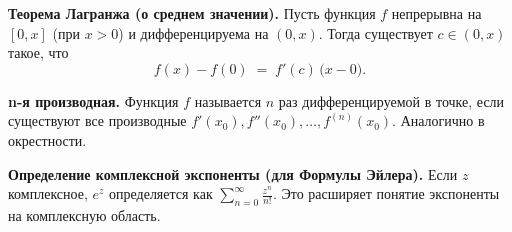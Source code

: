 
\textbf{Теорема Лагранжа (о среднем значении).}
Пусть функция $f$ непрерывна на $[0,x]$ (при $x>0$) и дифференцируема на $(0,x)$. Тогда существует $c\in(0,x)$ такое, что
\[
f(x)-f(0) \;=\; f'(c)\,\bigl(x - 0\bigr).
\]

\medskip

\textbf{n-я производная.}
Функция $f$ называется $n$ раз дифференцируемой в точке, если существуют все производные $f'(x_0), f''(x_0),\dots,f^{(n)}(x_0)$. Аналогично в окрестности.

\medskip

\textbf{Определение комплексной экспоненты (для Формулы Эйлера).}
Если $z$ комплексное, $e^z$ определяется как \(\sum_{n=0}^{\infty}\frac{z^n}{n!}\). Это расширяет понятие экспоненты на комплексную область.
